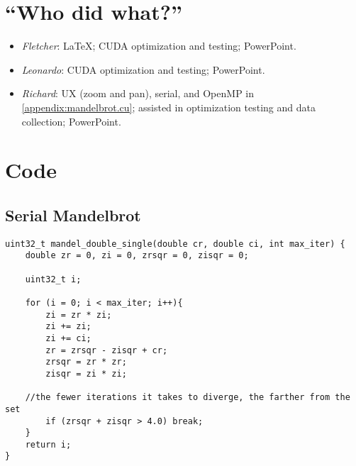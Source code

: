 \documentclass{article}
\begin{document}
\pagebreak    
\appendix
    \section{``Who did what?''}
        \begin{itemize}
        	\item \emph{Fletcher}: \LaTeX{}; CUDA optimization and testing; PowerPoint.

        	\item \emph{Leonardo}: CUDA optimization and testing; PowerPoint.

        	\item \emph{Richard}: UX (zoom and pan), serial, and OpenMP in \ref{appendix:mandelbrot.cu}; assisted in optimization testing and data collection; PowerPoint.
        \end{itemize}

    \section{Code}
        \lstset{language=C,stringstyle=\ttfamily, showstringspaces=false, numbers=left, frame=single, framexrightmargin=0pt, columns=fullflexible, breaklines=true, breakatwhitespace=true}

        \subsection{Serial Mandelbrot}\label{appendix:serial}
\begin{lstlisting}
uint32_t mandel_double_single(double cr, double ci, int max_iter) {
    double zr = 0, zi = 0, zrsqr = 0, zisqr = 0;

    uint32_t i;

    for (i = 0; i < max_iter; i++){
		zi = zr * zi;
		zi += zi;
		zi += ci;
		zr = zrsqr - zisqr + cr;
		zrsqr = zr * zr;
		zisqr = zi * zi;
		
    //the fewer iterations it takes to diverge, the farther from the set
		if (zrsqr + zisqr > 4.0) break;
    }
    return i;
}
\end{lstlisting}
\end{document}
